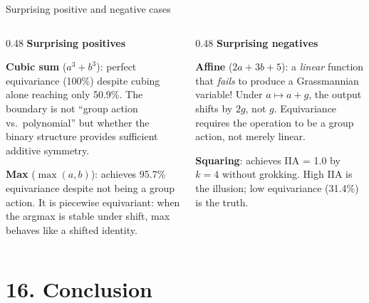 \documentclass[aspectratio=169,11pt]{beamer}
\begin{document}
\begin{frame}{Surprising positive and negative cases}

\begin{columns}[T]
\begin{column}{0.48\textwidth}
\textbf{\textcolor{pass}{Surprising positives}}

\vspace{0.3em}
{\small \textbf{Cubic sum} ($a^3 + b^3$): perfect equivariance (100\%) despite cubing alone reaching only 50.9\%. The boundary is not ``group action vs.\ polynomial'' but whether the binary structure provides sufficient additive symmetry.}

\vspace{0.5em}
{\small \textbf{Max} ($\max(a,b)$): achieves 95.7\% equivariance despite not being a group action. It is piecewise equivariant: when the argmax is stable under shift, max behaves like a shifted identity.}
\end{column}
\begin{column}{0.48\textwidth}
\textbf{\textcolor{fail}{Surprising negatives}}

\vspace{0.3em}
{\small \textbf{Affine} ($2a + 3b + 5$): a \emph{linear} function that \emph{fails} to produce a Grassmannian variable! Under $a \mapsto a + g$, the output shifts by $2g$, not $g$. Equivariance requires the operation to be a group action, not merely linear.}

\vspace{0.5em}
{\small \textbf{Squaring}: achieves IIA = 1.0 by $k = 4$ without grokking. High IIA is the illusion; low equivariance (31.4\%) is the truth.}
\end{column}
\end{columns}
\end{frame}

\section{16. Conclusion}
\end{document}
